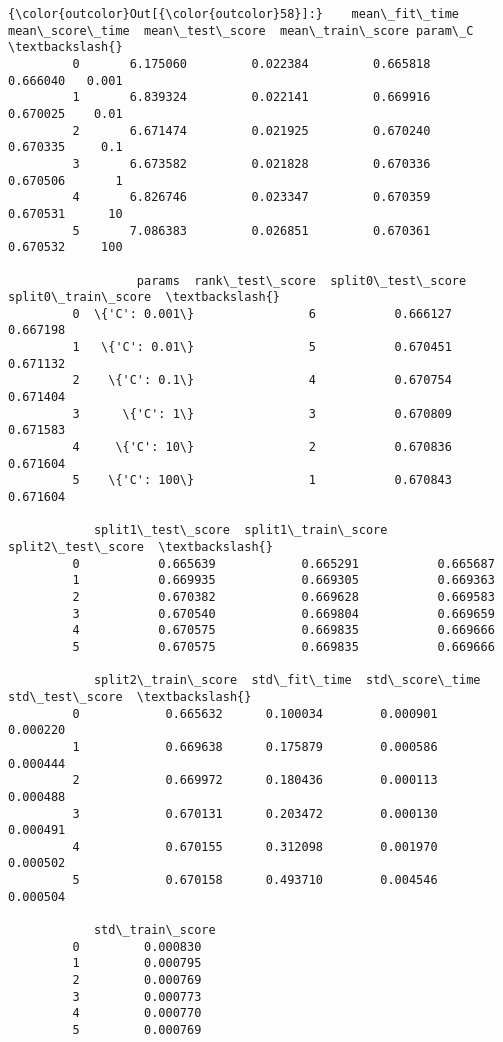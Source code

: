\documentclass[11pt]{article}
\begin{document}
            \begin{Verbatim}[commandchars=\\\{\}]
{\color{outcolor}Out[{\color{outcolor}58}]:}    mean\_fit\_time  mean\_score\_time  mean\_test\_score  mean\_train\_score param\_C  \textbackslash{}
         0       6.175060         0.022384         0.665818          0.666040   0.001   
         1       6.839324         0.022141         0.669916          0.670025    0.01   
         2       6.671474         0.021925         0.670240          0.670335     0.1   
         3       6.673582         0.021828         0.670336          0.670506       1   
         4       6.826746         0.023347         0.670359          0.670531      10   
         5       7.086383         0.026851         0.670361          0.670532     100   
         
                  params  rank\_test\_score  split0\_test\_score  split0\_train\_score  \textbackslash{}
         0  \{'C': 0.001\}                6           0.666127            0.667198   
         1   \{'C': 0.01\}                5           0.670451            0.671132   
         2    \{'C': 0.1\}                4           0.670754            0.671404   
         3      \{'C': 1\}                3           0.670809            0.671583   
         4     \{'C': 10\}                2           0.670836            0.671604   
         5    \{'C': 100\}                1           0.670843            0.671604   
         
            split1\_test\_score  split1\_train\_score  split2\_test\_score  \textbackslash{}
         0           0.665639            0.665291           0.665687   
         1           0.669935            0.669305           0.669363   
         2           0.670382            0.669628           0.669583   
         3           0.670540            0.669804           0.669659   
         4           0.670575            0.669835           0.669666   
         5           0.670575            0.669835           0.669666   
         
            split2\_train\_score  std\_fit\_time  std\_score\_time  std\_test\_score  \textbackslash{}
         0            0.665632      0.100034        0.000901        0.000220   
         1            0.669638      0.175879        0.000586        0.000444   
         2            0.669972      0.180436        0.000113        0.000488   
         3            0.670131      0.203472        0.000130        0.000491   
         4            0.670155      0.312098        0.001970        0.000502   
         5            0.670158      0.493710        0.004546        0.000504   
         
            std\_train\_score  
         0         0.000830  
         1         0.000795  
         2         0.000769  
         3         0.000773  
         4         0.000770  
         5         0.000769  
\end{Verbatim}
        
\end{document}
